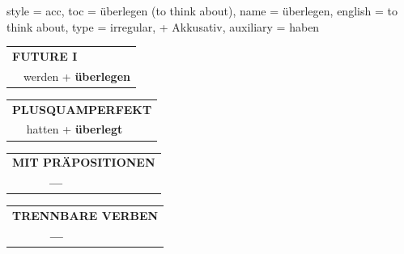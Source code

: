 \begin{verbentry}{
  style = {acc},
  toc = {überlegen (to think about)},
  name = {überlegen},
  english = {to think about},
  type = {irregular, + Akkusativ},
  auxiliary = {haben}
}
\begin{tabular}{rl}
    \multicolumn{2}{l}{\textbf{FUTURE I} }\\
  &  werden + \textbf{überlegen}\\
 
  \end{tabular}
\hfill
   \begin{tabular}{rl}
      \multicolumn{2}{l}{\textbf{PLUSQUAMPERFEKT}}\\
  &  hatten + \textbf{überlegt}\\
  \end{tabular}
  
  
\vspace{10pt}

\begin{tabular}{lll}
\multicolumn{3}{l}{\textbf{MIT PRÄPOSITIONEN}}\\
& \textbf{---} & \\
\end{tabular}
\hfill
\begin{tabular}{lll}
\multicolumn{3}{l}{\textbf{TRENNBARE VERBEN}}\\
& \textbf{---} & \\
\end{tabular}
\vspace{-5pt}
\end{verbentry}

